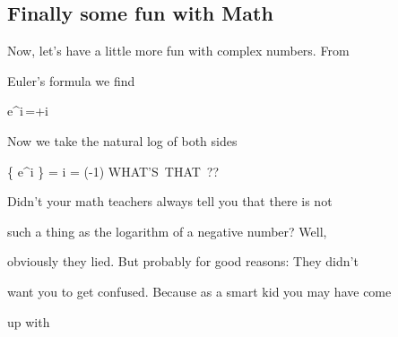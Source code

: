 %
%
%
%
%
%
%
%
%
%
%
%
%
%
%
%
%
%
%
%
%
%

\subsection{Finally some fun with Math}



Now, let's have a little more fun with complex numbers. From

Euler's formula we find

\bnn  e^{i\,\pi}=\cos\pi+i\,\sin{}  \enn

 Now we take the natural log of both sides

\bnn
   \ln \{ e^{i \pi} \} = i \pi = \ln(-1)  \qquad \mbox{WHAT'S THAT ??}
\enn

Didn't your math teachers always tell you that there is not

such a thing as the logarithm of a negative number? Well,

obviously they lied. But probably for good reasons: They didn't

want you to get confused. Because as a smart kid you may have come

up with

